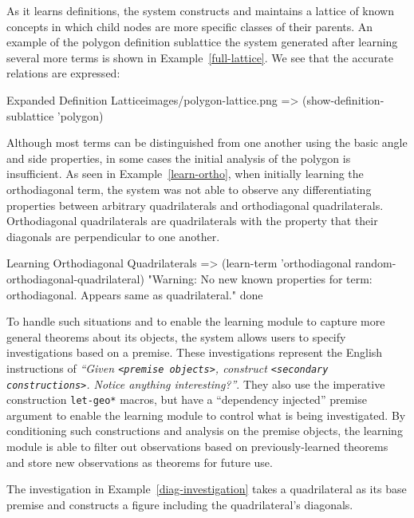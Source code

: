 As it learns definitions, the system constructs and maintains a
lattice of known concepts in which child nodes are more specific
classes of their parents. An example of the polygon definition
sublattice the system generated after learning several more terms is
shown in Example~\ref{full-lattice}. We see that the accurate
relations are expressed:

\begin{img-example}
[label=full-lattice,
breakable=false,
comment style={size=fbox,frame hidden,height=8.5cm}]
{Expanded Definition Lattice}{images/polygon-lattice.png}
=> (show-definition-sublattice 'polygon)
\end{img-example}

Although most terms can be distinguished from one another using the
basic angle and side properties, in some cases the initial analysis of
the polygon is insufficient. As seen in Example~\ref{learn-ortho},
when initially learning the orthodiagonal term, the system was not
able to observe any differentiating properties between arbitrary
quadrilaterals and orthodiagonal quadrilaterals. Orthodiagonal
quadrilaterals are quadrilaterals with the property that their
diagonals are perpendicular to one another.

\begin{repl-example}
[label=learn-ortho]
{Learning Orthodiagonal Quadrilaterals}
=> (learn-term 'orthodiagonal random-orthodiagonal-quadrilateral)
"Warning: No new known properties for term: orthodiagonal. Appears same as quadrilateral."
done

\end{repl-example}

To handle such situations and to enable the learning module to capture
more general theorems about its objects, the system allows users to
specify investigations based on a premise. These investigations
represent the English instructions of \emph{``Given \texttt{<premise
    objects>}, construct \texttt{<secondary constructions>}. Notice
  anything interesting?''}. They also use the imperative construction
\texttt{let-geo*} macros, but have a ``dependency injected'' premise
argument to enable the learning module to control what is being
investigated.  By conditioning such constructions and analysis on the
premise objects, the learning module is able to filter out
observations based on previously-learned theorems and store new
observations as theorems for future use.

The investigation in Example~\ref{diag-investigation} takes a
quadrilateral as its base premise and constructs a figure including
the quadrilateral's diagonals.

